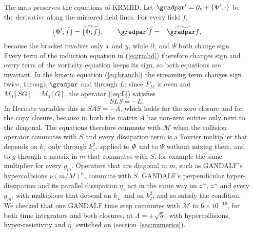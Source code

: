 The map preserves the equations of KRMHD. Let $\gradpar'=\partial_z+\{\Psi',\cdot\}$ be the derivative along the mirrored field lines. For every field $f$,
\begin{equation}\label{sym:gradpar}
  \{\Phi',\tilde f\}=\widetilde{\{\Phi,f\}},\qquad
  \gradpar'\tilde f=-\widetilde{\gradpar f},
\end{equation}
because the bracket involves only $x$ and $y$, while $\partial_z$ and $\Psi$ both change sign. Every term of the induction equation in (\ref{eq:rmhd}) therefore changes sign and every term of the vorticity equation keeps its sign, so both equations are invariant. In the kinetic equation (\ref{eq:branch}) the streaming term changes sign twice, through $\gradpar$ and through $L$: since $F_M$ is even and $M_0[SG]=M_0[G]$, the operator (\ref{eq:L}) satisfies
\begin{equation}\label{sym:SLS}
  SLS=-L .
\end{equation}
In Hermite variables this is $SAS=-A$, which holds for the zero closure and for the copy closure, because in both the matrix $A$ has non-zero entries only next to the diagonal. The equations therefore commute with $\mathcal M$ when the collision operator commutes with $S$ and every dissipation term is a Fourier multiplier that depends on $k_z$ only through $k_z^2$, applied to $\Phi$ and to $\Psi$ without mixing them, and to $g$ through a matrix in $m$ that commutes with $S$, for example the same multiplier for every $g_m$. Operators that are diagonal in $m$, such as GANDALF's hypercollisions $\nu(m/M)^n$, commute with $S$. GANDALF's perpendicular hyper-dissipation and its parallel dissipation $\eta_z$ act in the same way on $z^+$, $z^-$ and every $g_m$, with multipliers that depend on $k_\perp$ and on $k_z^2$, and so satisfy the condition. We checked that one GANDALF time step commutes with $\mathcal M$ to $6\times10^{-16}$, for both time integrators and both closures, at $\Lambda=\pm\sqrt5$, with hypercollisions, hyper-resistivity and $\eta_z$ switched on (section~\ref{sec:numerics}).


